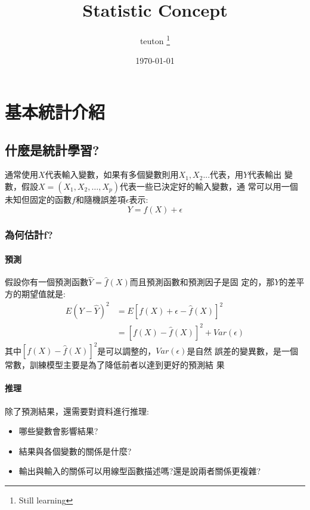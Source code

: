 \documentclass{report} %
\title{Statistic Concept}
\author{teuton%
\footnote{Still learning}%
}
\date{\today}
\begin{document}
\maketitle %
\tableofcontents %
\chapter{基本統計介紹}
  \section{什麼是統計學習?}
    通常使用$X$代表輸入變數，如果有多個變數則用$X_1,X_2...$代表，用$Y$代表輸出
      變數，假設$X = (X_1, X_2, \ldots, X_p)$代表一些已決定好的輸入變數，通
      常可以用一個未知但固定的函數$f$和隨機誤差項$\epsilon$表示:
    \begin{equation}
      Y = f(X) + \epsilon
    \end{equation}
    \subsection{為何估計f?}
      \subsubsection{預測}
        假設你有一個預測函數$\hat{Y} = \hat{f}(X)$而且預測函數和預測因子是固
          定的，那$Y$的差平方的期望值就是:
        \begin{equation}
          \begin{split}
              E(Y - \hat{Y}) ^ 2 & = E[f(X) + \epsilon - \hat{f}(X)]
                                     ^ 2\\
                                 & = [f(X) - \hat{f}(X)] ^ 2 +
                                     Var(\epsilon)
          \end{split}
        \end{equation}
        其中$[f(X) - \hat{f}(X)] ^ 2$是可以調整的，$Var(\epsilon)$是自然
          誤差的變異數，是一個常數，訓練模型主要是為了降低前者以達到更好的預測結
          果
      \subsubsection{推理}
        除了預測結果，還需要對資料進行推理:
        \begin{itemize}
          \item 哪些變數會影響結果?
          \item 結果與各個變數的關係是什麼?
          \item 輸出與輸入的關係可以用線型函數描述嗎?還是說兩者關係更複雜?
        \end{itemize}
\end{document}
